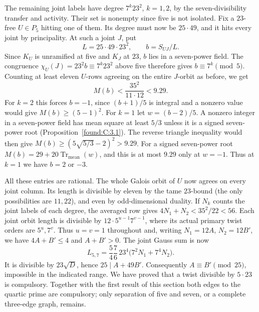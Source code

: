 \documentclass[11pt,a4paper]{article}
\numberwithin{equation}{section}
\theoremstyle{remark}
\begin{document}
The remaining joint labels have degree $7^k23^2$, $k=1,2$, by the
seven-divisibility transfer and activity. Their set is nonempty since
five is not isolated. Fix a $23$-free $U\in P_5$ hitting one of
them. Its degree must now be $25\cdot49$, and it hits every joint by
principality. At such a joint $J$, put
\[
 L=25\cdot49\cdot23^2,\qquad b=S_{UJ}/L.
\]
Since $K_U$ is unramified at five and $K_J$ at $23$, $b$ lies in
a seven-power field. The congruence $\chi_U(J)=23^2b\equiv
7^k23^2$ above five therefore gives $b\equiv7^k\pmod5$. Counting
at least eleven $U$-rows agreeing on the entire $J$-orbit as before,
we get
\[
 M(b)<\frac{35^2}{11\cdot12}<9.29 .
\]
For $k=2$ this forces $b=-1$, since $(b+1)/5$ is integral
and a nonzero value would give $M(b)\ge(5-1)^2$. For $k=1$ let
$w=(b-2)/5$. A nonzero integer in a seven-power field has mean
square at least $5/3$ unless it is a signed seven-power root (Proposition~\ref{found:C:3.1}).
The reverse triangle inequality would then give
$M(b)\ge(5\sqrt{5/3}-2)^2>9.29$. For a signed seven-power root
$M(b)=29+20\operatorname{Tr}_{\mathrm{mean}}(w)$, and this is
at most $9.29$ only at $w=-1$. Thus at $k=1$ we have $b=2$ or $-3$.

All these entries are rational. The whole Galois orbit of $U$ now
agrees on every joint column. Its length is divisible by eleven
by the tame $23$-bound (the only possibilities are $11,22$), and
even by odd-dimensional duality. If $N_k$ counts the joint labels
of each degree, the averaged row gives
$4N_1+N_2<35^2/22<56$. Each joint orbit length is divisible by
$12\cdot5^{u-1}7^{v-1}$, where its actual primary twist orders are
$5^u,7^v$. Thus $u=v=1$ throughout and, writing
$N_1=12A$, $N_2=12B'$, we have $4A+B'\le4$ and $A+B'>0$.
The joint Gauss sum is now
\[
 L_{5,7}=\frac{5}{4}\frac{7}{6}\,23^4
               \bigl(7^2 N_1+7^4N_2\bigr).
\]
It is divisible by $23\sqrt D$, hence $25\mid A+49B'$.
Consequently $A\equiv B'\pmod{25}$, impossible in the indicated
range. We have proved that a twist divisible by $5\cdot23$ is
compulsory. Together with the first result of this section both
edges to the quartic prime are compulsory; only separation of
five and seven, or a complete three-edge graph, remains.
\end{document}
